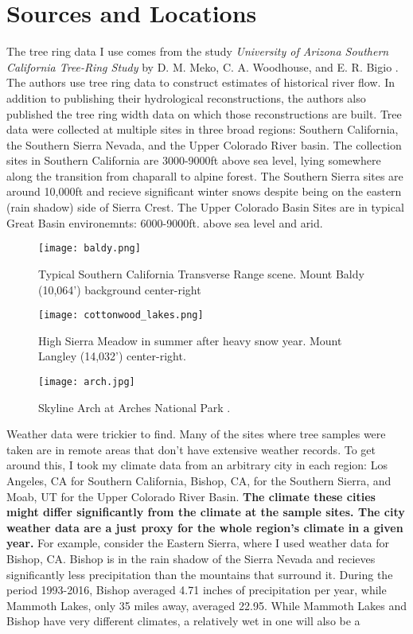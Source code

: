 \documentclass[]{article}
\begin{document}
\section{Sources and Locations}
The tree ring data I use comes from the study \textit{University of Arizona Southern California Tree-Ring Study} by D. M. Meko, C. A. Woodhouse, and E. R. Bigio \cite{tree_study}. The authors use tree ring data to construct estimates of historical river flow. In addition to publishing their hydrological reconstructions, the authors also published the tree ring width data on which those reconstructions are built.
Tree data were collected at multiple sites in three broad regions: Southern California, the Southern Sierra Nevada, and the Upper Colorado River basin. The collection sites in Southern California are 3000-9000ft above sea level, lying somewhere along the transition from chaparall to alpine forest. The Southern Sierra sites are around 10,000ft and recieve significant winter snows despite being on the eastern (rain shadow) side of Sierra Crest. The Upper Colorado Basin Sites are in typical Great Basin environemnts: 6000-9000ft. above sea level and arid. 

\begin{figure}
	\texttt{[image: baldy.png]}
	\caption{Typical Southern California Transverse Range scene. Mount Baldy (10,064') background center-right}
	\label{fig:baldy}
\end{figure}

\begin{figure}
	\texttt{[image: cottonwood\_lakes.png]}
	\caption{High Sierra Meadow in summer after heavy snow year. Mount Langley (14,032') center-right.}
	\label{fig:cottonwood}
\end{figure}

\begin{figure}
	\texttt{[image: arch.jpg]}
	\caption{Skyline Arch at Arches National Park \cite{arch_pic}.}
	\label{fig:arch}
\end{figure}

Weather data were trickier to find. Many of the sites where tree samples were taken are in remote areas that don't have extensive weather records. To get around this, I took my climate data from an arbitrary city in each region: Los Angeles, CA for Southern California, Bishop, CA, for the Southern Sierra, and Moab, UT for the Upper Colorado River Basin. \textbf{The climate these cities might differ significantly from the climate at the sample sites.  The city weather data are a just proxy for the whole region's climate in a given year.} For example, consider the Eastern Sierra, where I used weather data for Bishop, CA. Bishop is in the rain shadow of the Sierra Nevada and recieves significantly less precipitation than  the mountains that surround it. During the period 1993-2016, Bishop averaged 4.71 inches of precipitation per year,  while Mammoth Lakes, only 35 miles away, averaged 22.95. While Mammoth Lakes and Bishop have very different climates, a relatively wet in one will also be a
\end{document}

